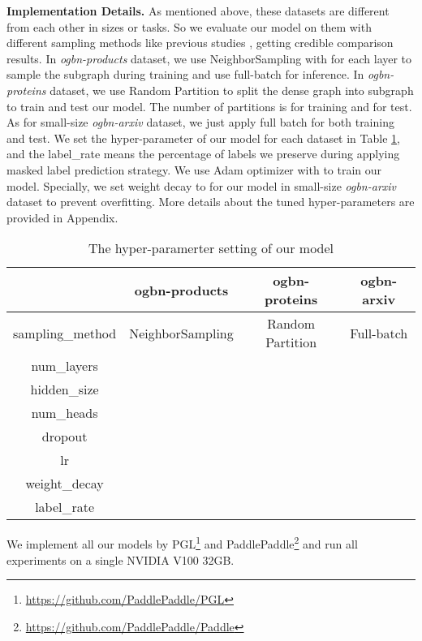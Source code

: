 \documentclass{article} \usepackage{iclr2021_conference,times}
\begin{document}
{\bf Implementation Details.} 
As mentioned above, these datasets are different from each other in sizes or tasks. So we evaluate our model on them with different sampling methods like previous studies  \citep{li2020deepergcn}, getting credible comparison results.
 In \emph{ogbn-products} dataset, we use NeighborSampling with  for each layer to sample the subgraph during training and use full-batch for inference. In \emph{ogbn-proteins} dataset, we use Random Partition to split the dense graph into subgraph to train and test our model. The number of partitions is  for training and  for test. As for small-size \emph{ogbn-arxiv} dataset, we just apply full batch for both training and test. We set the hyper-parameter of our model for each dataset in Table \ref{table:params}, and the label\_rate means the percentage of labels we preserve during applying masked label prediction strategy. We use Adam optimizer with  to train our model. Specially, we set weight decay to  for our model in small-size \emph{ogbn-arxiv} dataset to prevent overfitting. More details about the tuned hyper-parameters are provided in Appendix.
\begin{table}[htbp]
	\setlength{\abovecaptionskip}{0.cm}
	\setlength{\belowcaptionskip}{-.2cm}
	\caption{The hyper-paramerter setting of our model}
	\begin{center}
		\begin{tabular}{cccc}
			& {\bf ogbn-products} &  {\bf ogbn-proteins	}  &  {\bf ogbn-arxiv} \\
			\hline
			sampling\_method &NeighborSampling & Random Partition & Full-batch \\
			num\_layers &   &  & \\ 
			hidden\_size &  &  & \\ 
			num\_heads &  &  & \\ 
			dropout  &  &  & \\ 
			lr &  &  & \\ 
			weight\_decay&  &  & \\ 
			label\_rate&  &  & \\ 
		\end{tabular}
	\end{center}
	\label{table:params}
	\vspace{-4mm}
\end{table}

We implement all our models by PGL\footnote[1]{\url{https://github.com/PaddlePaddle/PGL}} and PaddlePaddle\footnote[2]{\url{https://github.com/PaddlePaddle/Paddle}} and run all experiments on a single NVIDIA V100 32GB.
\end{document}
